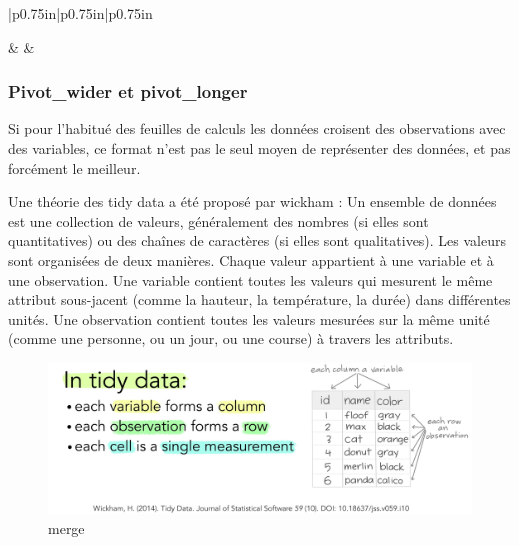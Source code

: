 \documentclass[
]{book}
\begin{document}
\begin{longtable}[c]{|p{0.75in}|p{0.75in}|p{0.75in}}
\noalign{\global\setlength{\arrayrulewidth}{0.5pt}}



 &  &  \\

\noalign{\global\setlength{\arrayrulewidth}{2pt}}



\end{longtable}

\hypertarget{pivot_wider-et-pivot_longer}{%
\subsubsection{Pivot\_wider et pivot\_longer}\label{pivot_wider-et-pivot_longer}}

Si pour l'habitué des feuilles de calculs les données croisent des observations avec des variables, ce format n'est pas le seul moyen de représenter des données, et pas forcément le meilleur.

Une théorie des tidy data a été proposé par wickham : Un ensemble de données est une collection de valeurs, généralement des nombres (si elles sont quantitatives) ou des chaînes de caractères (si elles sont qualitatives). Les valeurs sont organisées de deux manières. Chaque valeur appartient à une variable et à une observation. Une variable contient toutes les valeurs qui mesurent le même attribut sous-jacent (comme la hauteur, la température, la durée) dans différentes unités. Une observation contient toutes les valeurs mesurées sur la même unité (comme une personne, ou un jour, ou une course) à travers les attributs.

\begin{figure}
\centering
\includegraphics{./Images/tidydata_1.jpg}
\caption{merge}
\end{figure}
\end{document}
